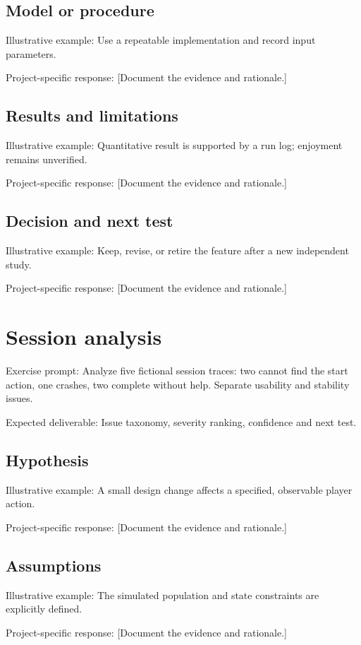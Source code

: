 \documentclass[11pt]{article}
\begin{document}
\subsection{Model or procedure}
Illustrative example: Use a repeatable implementation and record input parameters.

Project-specific response: [Document the evidence and rationale.]


\subsection{Results and limitations}
Illustrative example: Quantitative result is supported by a run log; enjoyment remains unverified.

Project-specific response: [Document the evidence and rationale.]


\subsection{Decision and next test}
Illustrative example: Keep, revise, or retire the feature after a new independent study.

Project-specific response: [Document the evidence and rationale.]


\section{Session analysis}
Exercise prompt: Analyze five fictional session traces: two cannot find the start action, one crashes, two complete without help. Separate usability and stability issues.

Expected deliverable: Issue taxonomy, severity ranking, confidence and next test.


\subsection{Hypothesis}
Illustrative example: A small design change affects a specified, observable player action.

Project-specific response: [Document the evidence and rationale.]


\subsection{Assumptions}
Illustrative example: The simulated population and state constraints are explicitly defined.

Project-specific response: [Document the evidence and rationale.]
\end{document}

